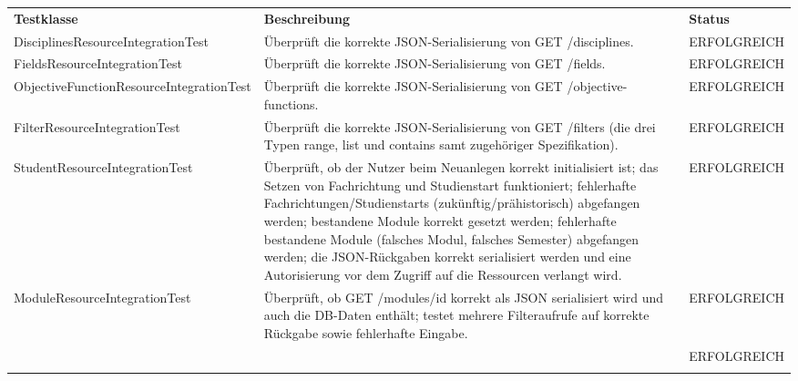 \begin{longtable}{| >{\hspace{0pt}} p{} | >{\hspace{0pt}} p{} | >{\hspace{0pt}} p{} |}
	\hline
	\textbf{Testklasse} & \textbf{Beschreibung} & \textbf{Status} \\ 
	\hhline{|=|=|=|}  
	\endfirsthead
	\endhead
	DisciplinesResourceIntegrationTest & Überprüft die korrekte JSON-Serialisierung von GET /disciplines. & ERFOLGREICH \\
	\hline
	FieldsResourceIntegrationTest & Überprüft die korrekte JSON-Serialisierung von GET /fields. & ERFOLGREICH \\
	\hline
	ObjectiveFunctionResourceIntegrationTest & Überprüft die korrekte JSON-Serialisierung von GET /objective-functions. & ERFOLGREICH \\
	\hline
	FilterResourceIntegrationTest & Überprüft die korrekte JSON-Serialisierung von GET /filters (die drei Typen range, list und contains samt zugehöriger Spezifikation). & ERFOLGREICH \\
	\hline
	StudentResourceIntegrationTest & Überprüft, ob der Nutzer beim Neuanlegen korrekt initialisiert ist; das Setzen von Fachrichtung und Studienstart funktioniert; fehlerhafte Fachrichtungen/Studienstarts (zukünftig/prähistorisch) abgefangen werden; bestandene Module korrekt gesetzt werden; fehlerhafte bestandene Module (falsches Modul, falsches Semester) abgefangen werden; die JSON-Rückgaben korrekt serialisiert werden und eine Autorisierung vor dem Zugriff auf die Ressourcen verlangt wird. & ERFOLGREICH \\
	\hline
	ModuleResourceIntegrationTest & Überprüft, ob GET /modules/id korrekt als JSON serialisiert wird und auch die DB-Daten enthält; testet mehrere Filteraufrufe auf korrekte Rückgabe sowie fehlerhafte Eingabe. & ERFOLGREICH \\
	\hline
	
	& & ERFOLGREICH \\
	
	\hhline{|=|=|=|}  
\end{longtable}